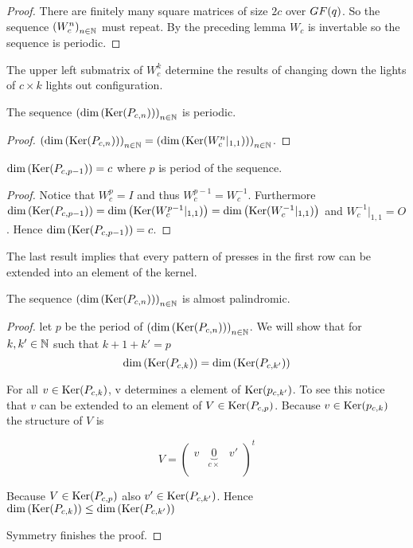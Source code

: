 \begin{proof}
  There are finitely many square matrices of size $2c$ over
  $GF(q)$. So the sequence $\left(W_{c}^{n}\right)_{n\in\mathbb{N}}$ must
  repeat. By the preceding lemma $W_{c}$ is invertable so the
  sequence is periodic.
\end{proof}

The upper left submatrix of $W_{c}^{k}$ determine the results of
changing down the lights of $c \times k$ lights out configuration.

\begin{corollary}
  The sequence $\left(\dim\left(\operatorname{Ker}(P_{c,n})\right)\right)_{n\in\mathbb{N}}$
  is periodic.
\end{corollary}

\begin{proof}
  $\left(\dim\left(\operatorname{Ker}(P_{c,n})\right)\right)_{n\in\mathbb{N}} = \left(\dim\left(\operatorname{Ker}(W_{c}^{n}|_{1,1})\right)\right)_{n\in\mathbb{N}}$.
\end{proof}

\begin{lemma}
  $\dim\left(\operatorname{Ker}(P_{c,p-1})\right) = c$ where $p$ is period of the sequence. 
\end{lemma}

\begin{proof}
  Notice that $W_{c}^{p} = I$ and thus $W_{c}^{p-1} =  W_{c}^{-1}$.
  Furthermore $\dim\left(\operatorname{Ker}(P_{c,p-1})\right) =
  \dim\left(\operatorname{Ker}(W_{c}^{p-1}|_{1,1})\right) =
  \dim\left(\operatorname{Ker}(W_{c}^{-1}|_{1,1})\right)$ and $W_{c}^{-1}|_{1,1} = O$. 
  Hence $\dim\left(\operatorname{Ker}(P_{c,p-1})\right) = c$.
\end{proof}

The last result implies that every pattern of presses in the first row
can be extended into an element of the kernel.

\begin{theorem}
  The sequence $\left(\dim\left(\operatorname{Ker}(P_{c,n})\right)\right)_{n\in\mathbb{N}}$
  is almost palindromic.
\end{theorem}

\begin{proof}
  let $p$ be the period of
  $\left(\dim\left(\operatorname{Ker}(P_{c,n})\right)\right)_{n\in\mathbb{N}}$. We will show
  that for $k,k'\in\mathbb{N}$ such that $k+1+k'=p$
  \[
  \dim\left(\operatorname{Ker}(P_{c,k})\right) = \dim\left(\operatorname{Ker}(P_{c,k'})\right)
  \]

  For all $v\in\operatorname{Ker}(P_{c,k})$, v determines a element of
  $\operatorname{Ker}(p_{c,k'})$. To see this notice that $v$ can be extended to an
  element of $V\in\operatorname{Ker}(P_{c,p})$. Because $v\in\operatorname{Ker}(p_{c,k})$ the
  structure of $V$ is
  
  \[
  V =
  \left(
  \begin{array}{ccc}
    v & \underbrace{0}_{c\times} & v' \\
  \end{array}
  \right)^{t}
  \]
  
  Because $V\in\operatorname{Ker}(P_{c,p})$ also
  $v'\in\operatorname{Ker}(P_{c,k'})$. Hence  $\dim\left(\operatorname{Ker}(P_{c,k})\right) \le
  \dim\left(\operatorname{Ker}(P_{c,k'})\right)$ 

  Symmetry finishes the proof.
\end{proof}
